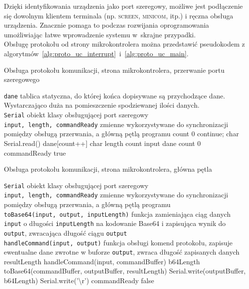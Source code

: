 Dzięki identyfikowania urządzenia jako port szeregowy, możliwe jest podłączenie się dowolnym klientem terminala (np. \textsc{screen}, \textsc{minicom}, itp.) i ręczna obsługa urządzenia.
Znacznie pomaga to podczas rozwijania oprogramowania umożliwiając łatwe wprowadzenie systemu w~skrajne przypadki.\\

Obsługę protokołu od strony mikrokontrolera można przedstawić pseudokodem z algorytmów~\ref{alg:proto_uc_interrupt}~i~\ref{alg:proto_uc_main}.
\begin{algorithm}
\caption{Obsługa protokołu komunikacji, strona mikrokontrolera, przerwanie portu szeregowego}
\label{alg:proto_uc_interrupt}
\begin{algorithmic}[1]
  \REQUIRE \texttt{dane} \ppauza tablica statyczna, do której końca dopisywane są przychodzące dane. Wystarczająco duża na pomieszczenie spodziewanej ilości danych.\\
  \texttt{Serial} \ppauza obiekt klasy obsługującej port szeregowy\\
  \texttt{input, length, commandReady} \ppauza zmienne wykorzystywane do synchronizacji pomiędzy obsługą przerwania, a główną pętlą programu
  \STATE count \textleftarrow{} $0$
      \STATE continue;
    \ENDIF
    \STATE char \textleftarrow{} Serial.read()
    \STATE dane[count++] \textleftarrow{} char
      \STATE length \textleftarrow{} count
      \STATE input \textleftarrow{} dane
      \STATE count \textleftarrow{} $0$
      \STATE commandReady \textleftarrow{} true
    \ENDIF
  \ENDWHILE
\end{algorithmic}
\end{algorithm}

\begin{algorithm}
\caption{Obsługa protokołu komunikacji, strona mikrokontrolera, główna pętla}
\label{alg:proto_uc_main}
\begin{algorithmic}[1]
  \REQUIRE \texttt{Serial} \ppauza obiekt klasy obsługującej port szeregowy\\
  \texttt{input, length, commandReady} \ppauza zmienne wykorzystywane do synchronizacji pomiędzy obsługą przerwania, a główną pętlą programu\\
  \texttt{toBase64(input, output, inputLength)} \ppauza funkcja zamieniająca ciąg danych \texttt{input} o długości \texttt{inputLength} na kodowanie Base64 i zapisująca wynik do \texttt{output}, zwracająca długość ciągu \texttt{output}\\
  \texttt{handleCommand(input, output)} \ppauza funkcja obsługi komend protokołu, zapisuje ewentualne dane zwrotne w buforze \texttt{output}, zwraca długość zapisanych danych
      \STATE resultLength \textleftarrow{} handleCommand(input, commandBuffer)
      \STATE b64Length \textleftarrow{} toBase64(commandBuffer, outputBuffer, resultLength)
      \STATE Serial.write(outputBuffer, b64Length)
      \STATE Serial.write('\textbackslash{}r')
      \STATE commandReady \textleftarrow{} false
    \ENDIF
  \ENDWHILE
\end{algorithmic}
\end{algorithm}
